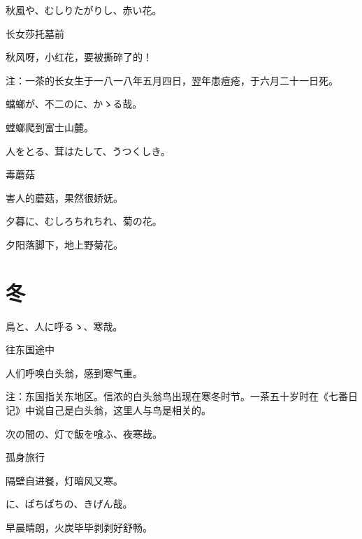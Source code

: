 \begin{haiku}
    {\FH 秋風や、むしりたがりし、赤い花。}

    {\FK 长女莎托墓前}

    {\FK 秋风呀，小红花，要被撕碎了的！}

    {\FT 注：一茶的长女生于一八一八年五月四日，翌年患痘疮，于六月二十一日死。}
\end{haiku}

\begin{haiku}
    {\FH 蟷螂が、不二のに、かゝる哉。}

    {\FK 螳螂爬到富士山麓。}
\end{haiku}

\begin{haiku}
    {\FH 人をとる、茸はたして、うつくしき。}

    {\FK 毒蘑菇}

    {\FK 害人的蘑菇，果然很娇妩。}
\end{haiku}

\begin{haiku}
    {\FH 夕暮に、むしろちれちれ、菊の花。}

    {\FK 夕阳落脚下，地上野菊花。}
\end{haiku}

\section{\FK 冬}

\setcounter{haikucounter}{0}

\begin{haiku}
    {\FH {}鳥と、人に呼るゝ、寒哉。}

    {\FK 往东国途中}

    {\FK 人们呼唤白头翁，感到寒气重。}

    {\FT 注：东国指关东地区。信浓的白头翁鸟出现在寒冬时节。一茶五十岁时在《七番日记》中说自己是白头翁，这里人与鸟是相关的。}
\end{haiku}

\begin{haiku}
    {\FH 次の間の、灯で飯を喰ふ、夜寒哉。}

    {\FK 孤身旅行}

    {\FK 隔壁自进餐，灯暗风又寒。}
\end{haiku}

\begin{haiku}
    {\FH {}に、ぱちぱちの、きげん哉。}

    {\FK 早晨晴朗，火炭毕毕剥剥好舒畅。}
\end{haiku}

